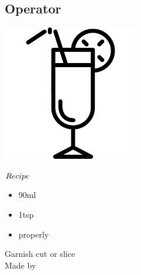 \subsection{Operator}
\vspace{-7.6mm}
\hspace{30mm}
\includegraphics[scale=.07]{cocktail_glass_tall.png}
\vspace{2.5mm}
\begin{itembox}[l]{\boldmath $Recipe$}
\begin{itemize}
\setlength{\parskip}{0cm}
\setlength{\itemsep}{0cm}
\item \ww 90ml
\item \lj 1tsp
\item \ga properly
\end{itemize}
\vspace{-4mm}
Garnish \lemon cut or slice\\
Made by \build
\end{itembox}
